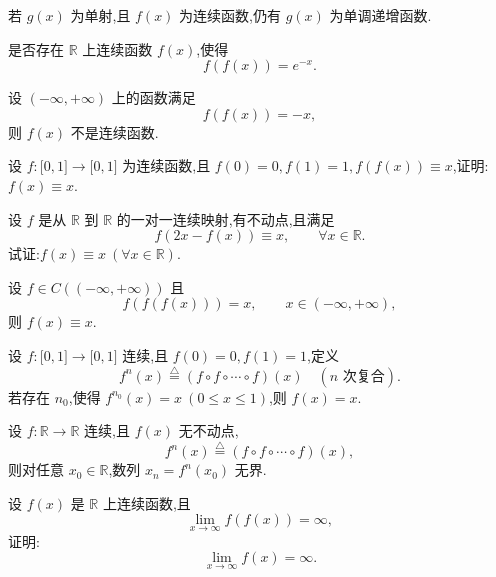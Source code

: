 \documentclass[../数学分析培优讲义.tex]{subfiles}
\begin{document}
\begin{corollary}[\markstar]
若 $g(x)$ 为单射,且 $f(x)$ 为连续函数,仍有 $g(x)$ 为单调递增函数.
\end{corollary}

\begin{example}
是否存在 $\mathbb{R}$ 上连续函数 $f(x)$,使得
\[
    f(f(x))=e^{-x}.
\]
\end{example}
\exampleblank

\begin{example}
设 $(-\infty,+\infty)$ 上的函数满足
\[
    f(f(x))=-x,
\]
则 $f(x)$ 不是连续函数.
\end{example}
\exampleblank

\begin{example}
设 $f:\lbrack 0,1\rbrack\to\lbrack 0,1\rbrack$ 为连续函数,且 $f(0)=0,f(1)=1,f(f(x))\equiv x$,证明:$f(x)\equiv x$.
\end{example}
\exampleblank

\begin{example}
设 $f$ 是从 $\mathbb{R}$ 到 $\mathbb{R}$ 的一对一连续映射,有不动点,且满足
\[
    f(2x-f(x))\equiv x,
    \qquad \forall x\in\mathbb{R}.
\]
试证:$f(x)\equiv x\ (\forall x\in\mathbb{R})$.
\end{example}
\exampleblank

\begin{example}
设 $f\in C(( -\infty,+\infty))$ 且
\[
    f(f(f(x)))=x,
    \qquad x\in(-\infty,+\infty),
\]
则 $f(x)\equiv x$.
\end{example}
\exampleblank

\begin{example}
设 $f:\lbrack 0,1\rbrack\to\lbrack 0,1\rbrack$ 连续,且 $f(0)=0,f(1)=1$,定义
\[
    f^n(x)\overset{\triangle}{=}(f\circ f\circ\cdots\circ f)(x)
    \quad(n\text{ 次复合}).
\]
若存在 $n_0$,使得 $f^{n_0}(x)=x\ (0\leq x\leq1)$,则 $f(x)=x$.
\end{example}
\exampleblank

\begin{example}
设 $f:\mathbb{R}\to\mathbb{R}$ 连续,且 $f(x)$ 无不动点,
\[
    f^n(x)\overset{\triangle}{=}(f\circ f\circ\cdots\circ f)(x),
\]
则对任意 $x_0\in\mathbb{R}$,数列 $x_n=f^n(x_0)$ 无界.
\end{example}
\exampleblank

\begin{example}
设 $f(x)$ 是 $\mathbb{R}$ 上连续函数,且
\[
    \lim\limits_{x\to\infty}f(f(x))=\infty,
\]
证明:
\[
    \lim\limits_{x\to\infty}f(x)=\infty.
\]
\end{example}
\exampleblank
\end{document}
